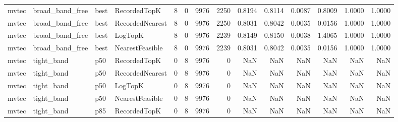\begin{tabular}{llllrrrrrrrrrr}
   mvtec &      broad\_band\_free &   best &    RecordedTopK &           8 &          0 &           9976 &                2250 &         0.8194 &          0.8114 &                    0.0087 &         0.8009 &                 1.0000 &                  1.0000 \\
   mvtec &      broad\_band\_free &   best & RecordedNearest &           8 &          0 &           9976 &                2250 &         0.8031 &          0.8042 &                    0.0035 &         0.0156 &                 1.0000 &                  1.0000 \\
   mvtec &      broad\_band\_free &   best &         LogTopK &           8 &          0 &           9976 &                2239 &         0.8149 &          0.8150 &                    0.0038 &         1.4065 &                 1.0000 &                  1.0000 \\
   mvtec &      broad\_band\_free &   best & NearestFeasible &           8 &          0 &           9976 &                2239 &         0.8031 &          0.8042 &                    0.0035 &         0.0156 &                 1.0000 &                  1.0000 \\
   mvtec &           tight\_band &    p50 &    RecordedTopK &           0 &          8 &           9976 &                   0 &            NaN &             NaN &                       NaN &            NaN &                    NaN &                     NaN \\
   mvtec &           tight\_band &    p50 & RecordedNearest &           0 &          8 &           9976 &                   0 &            NaN &             NaN &                       NaN &            NaN &                    NaN &                     NaN \\
   mvtec &           tight\_band &    p50 &         LogTopK &           0 &          8 &           9976 &                   0 &            NaN &             NaN &                       NaN &            NaN &                    NaN &                     NaN \\
   mvtec &           tight\_band &    p50 & NearestFeasible &           0 &          8 &           9976 &                   0 &            NaN &             NaN &                       NaN &            NaN &                    NaN &                     NaN \\
   mvtec &           tight\_band &    p85 &    RecordedTopK &           0 &          8 &           9976 &                   0 &            NaN &             NaN &                       NaN &            NaN &                    NaN &                     NaN \\

\end{tabular}
